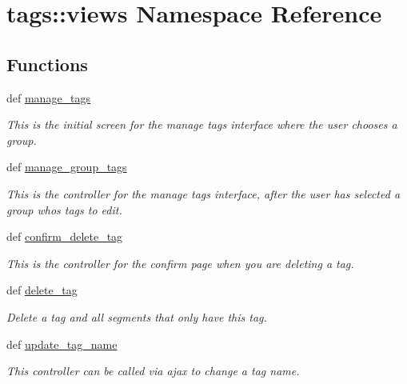 \hypertarget{namespacetags_1_1views}{
\section{tags::views Namespace Reference}
\label{namespacetags_1_1views}
}
\subsection*{Functions}
\begin{DoxyCompactItemize}
\item 
def \hyperlink{namespacetags_1_1views_af006f60efb3b9aed7cd22d6a966721a5}{manage\_\-tags}
\begin{DoxyCompactList}\small\item\em This is the initial screen for the manage tags interface where the user chooses a group. \item\end{DoxyCompactList}\item 
def \hyperlink{namespacetags_1_1views_a42b3092cefc6be85ca65d6442f0b606d}{manage\_\-group\_\-tags}
\begin{DoxyCompactList}\small\item\em This is the controller for the manage tags interface, after the user has selected a group whos tags to edit. \item\end{DoxyCompactList}\item 
def \hyperlink{namespacetags_1_1views_a72da48804d9f7c0828ef5a13d36ca319}{confirm\_\-delete\_\-tag}
\begin{DoxyCompactList}\small\item\em This is the controller for the confirm page when you are deleting a tag. \item\end{DoxyCompactList}\item 
def \hyperlink{namespacetags_1_1views_ae5fb78f65b92c5cb442c487ba09a2f3d}{delete\_\-tag}
\begin{DoxyCompactList}\small\item\em Delete a tag and all segments that only have this tag. \item\end{DoxyCompactList}\item 
def \hyperlink{namespacetags_1_1views_a8990a5653c9a0a885a8ce3f1aed44d32}{update\_\-tag\_\-name}
\begin{DoxyCompactList}\small\item\em This controller can be called via ajax to change a tag name. \item\end{DoxyCompactList}\item 

\end{DoxyCompactItemize}

